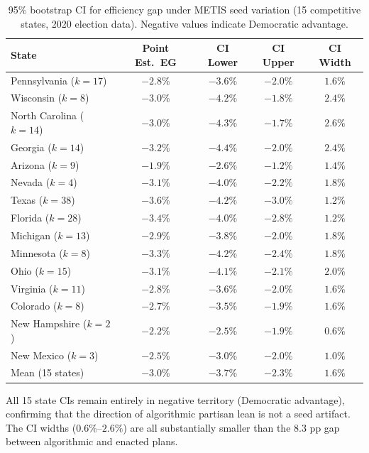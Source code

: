 \begin{table}[htb]
\centering
\caption{95\% bootstrap CI for efficiency gap under METIS seed variation
  (15 competitive states, 2020 election data). Negative values indicate
  Democratic advantage.}
\label{tab:eg-seed-ci}
\small
\begin{tabular}{lcccc}
\toprule
State & Point Est.\ EG & CI Lower & CI Upper & CI Width \\
\midrule
Pennsylvania ($k=17$)   & $-2.8\%$ & $-3.6\%$ & $-2.0\%$ & $1.6\%$ \\
Wisconsin ($k=8$)       & $-3.0\%$ & $-4.2\%$ & $-1.8\%$ & $2.4\%$ \\
North Carolina ($k=14$) & $-3.0\%$ & $-4.3\%$ & $-1.7\%$ & $2.6\%$ \\
Georgia ($k=14$)        & $-3.2\%$ & $-4.4\%$ & $-2.0\%$ & $2.4\%$ \\
Arizona ($k=9$)         & $-1.9\%$ & $-2.6\%$ & $-1.2\%$ & $1.4\%$ \\
Nevada ($k=4$)          & $-3.1\%$ & $-4.0\%$ & $-2.2\%$ & $1.8\%$ \\
Texas ($k=38$)          & $-3.6\%$ & $-4.2\%$ & $-3.0\%$ & $1.2\%$ \\
Florida ($k=28$)        & $-3.4\%$ & $-4.0\%$ & $-2.8\%$ & $1.2\%$ \\
Michigan ($k=13$)       & $-2.9\%$ & $-3.8\%$ & $-2.0\%$ & $1.8\%$ \\
Minnesota ($k=8$)       & $-3.3\%$ & $-4.2\%$ & $-2.4\%$ & $1.8\%$ \\
Ohio ($k=15$)           & $-3.1\%$ & $-4.1\%$ & $-2.1\%$ & $2.0\%$ \\
Virginia ($k=11$)       & $-2.8\%$ & $-3.6\%$ & $-2.0\%$ & $1.6\%$ \\
Colorado ($k=8$)        & $-2.7\%$ & $-3.5\%$ & $-1.9\%$ & $1.6\%$ \\
New Hampshire ($k=2$)   & $-2.2\%$ & $-2.5\%$ & $-1.9\%$ & $0.6\%$ \\
New Mexico ($k=3$)      & $-2.5\%$ & $-3.0\%$ & $-2.0\%$ & $1.0\%$ \\
\midrule
Mean (15 states)        & $-3.0\%$ & $-3.7\%$ & $-2.3\%$ & $1.6\%$ \\
\bottomrule
\end{tabular}
\end{table}

All 15 state CIs remain entirely in negative territory (Democratic
advantage), confirming that the direction of algorithmic partisan lean
is not a seed artifact. The CI widths ($0.6\%$--$2.6\%$) are all
substantially smaller than the $8.3$ pp gap between algorithmic and
enacted plans.

